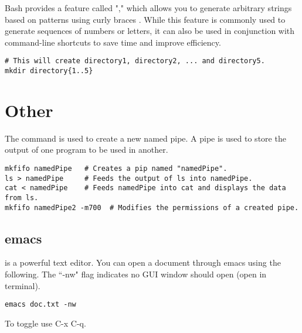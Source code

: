 Bash provides a feature called "," which allows you to generate arbitrary strings based on patterns using curly braces {}. While this feature is commonly used to generate sequences of numbers or letters, it can also be used in conjunction with command-line shortcuts to save time and improve efficiency.
\begin{lstlisting}
# This will create directory1, directory2, ... and directory5.
mkdir directory{1..5}
\end{lstlisting}




\section{Other}
\lstset{language=Bash, style=terminalstyle}

The  command is used to create a new named pipe. A pipe is used to store the output of one program to be used in another.
\begin{lstlisting}
mkfifo namedPipe   # Creates a pip named "namedPipe".
ls > namedPipe     # Feeds the output of ls into namedPipe.
cat < namedPipe    # Feeds namedPipe into cat and displays the data from ls.
mkfifo namedPipe2 -m700  # Modifies the permissions of a created pipe.
\end{lstlisting}

\subsection{emacs}
 is a powerful text editor. You can open a document through emacs using the following. The ``-nw" flag indicates no GUI window should open (open in terminal).
\begin{lstlisting}
emacs doc.txt -nw
\end{lstlisting}
To toggle  use C-x C-q.
